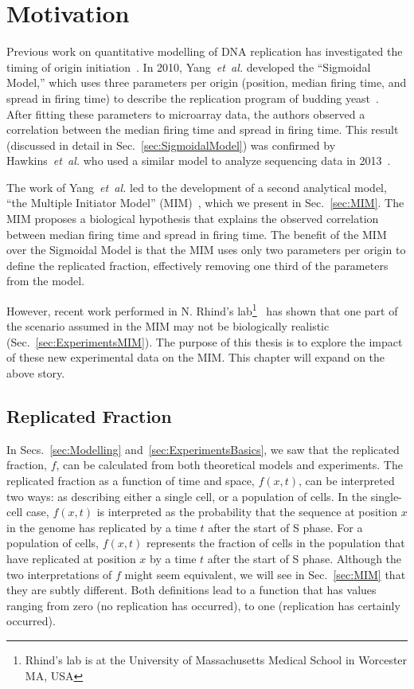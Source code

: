 \chapter{Motivation}
\label{ch:Motivation}

Previous work on quantitative modelling of DNA replication has investigated the timing of origin initiation~\cite{ScottsPaper,deMouraModel1,StochasticTermination,Goldar2009,OriginTimingReview}.
In 2010, Yang~\emph{et~al.} developed the ``Sigmoidal Model,'' which uses three parameters per origin (position, median firing time, and spread in firing time) to describe the replication program of budding yeast~\cite{ScottsPaper}.
After fitting these parameters to microarray data, the authors observed a correlation between the median firing time and spread in firing time.
This result (discussed in detail in Sec.~\ref{sec:SigmoidalModel}) was confirmed by Hawkins~\emph{et~al.} who used a similar model to analyze sequencing data in 2013~\cite{StochasticTermination}.

The work of Yang~\emph{et~al.} led to the development of a second analytical model, ``the Multiple Initiator Model'' (MIM)~\cite{ScottsPaper}, which we present in Sec.~\ref{sec:MIM}.
The MIM proposes a biological hypothesis that explains the observed correlation between median firing time and spread in firing time.
The benefit of the MIM over the Sigmoidal Model is that the MIM uses only two parameters per origin to define the replicated fraction, effectively removing one third of the parameters from the model.

However, recent work performed in N. Rhind's lab\footnote{
Rhind's lab is at the University of Massachusetts Medical School in Worcester MA, USA}~\cite{Rhind}
has shown that one part of the scenario assumed in the MIM may not be biologically realistic (Sec.~\ref{sec:ExperimentsMIM}).
The purpose of this thesis is to explore the impact of these new experimental data on the MIM.
This chapter will expand on the above story.


	\section{Replicated Fraction}
	\label{sec:ReplicatedFraction}
	
	In Secs.~\ref{sec:Modelling} and~\ref{sec:ExperimentsBasics}, we saw that the replicated fraction, $f$, can be calculated from both theoretical models and experiments.
	The replicated fraction as a function of time and space, $f(x,t)$, can be interpreted two ways:
	as describing either a single cell, or a population of cells.
	In the single-cell case, $f(x,t)$ is interpreted as the probability that the sequence at position $x$ in the genome has replicated by a time $t$ after the start of S phase.
	For a population of cells, $f(x,t)$ represents the fraction of cells in the population that have replicated at position $x$ by a time $t$ after the start of S phase.
	Although the two interpretations of $f$ might seem equivalent, we will see in Sec.~\ref{sec:MIM} that they are subtly different.
	Both definitions lead to a function that has values ranging from zero (no replication has occurred), to one (replication has certainly occurred).
	
